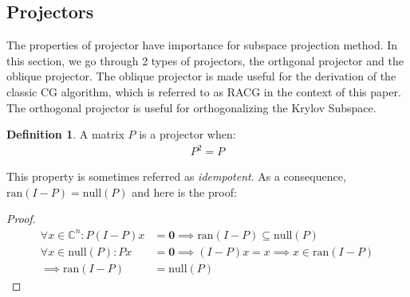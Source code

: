 \documentclass[]{article}
\theoremstyle{definition}
\newtheorem{definition}{Definition}
\begin{document}
    \subsection{Projectors}
        The properties of projector have importance for subspace projection method. In this section, we go through 2 types of projectors, the orthgonal projector and the oblique projector. The oblique projector is made useful for the derivation of the classic CG algorithm, which is referred to as RACG in the context of this paper. The orthogonal projector is useful for orthogonalizing the Krylov Subspace. 
        \begin{definition}
            A matrix $P$ is a projector when: 
            \begin{align}
                P^2 = P
            \end{align}    
        \end{definition}
        This property is sometimes referred as \textit{idempotent}. As a consequence, $\text{ran}(I - P) = \text{null}(P)$ and here is the proof: 
        \begin{proof}
            \begin{align}
                \forall x \in \mathbb{C}^n: P(I - P)x &= \mathbf{0} \implies \text{ran}(I - P)\subseteq \text{null}(P)
                \\
                \forall x \in \text{null}(P): Px &= \mathbf{0} \implies (I - P)x = x \implies x \in \text{ran}(I - P)
                \\
                \implies \text{ran}(I - P) &= \text{null}(P)
                \label{a:1.1.4}
            \end{align}
        \end{proof}
        \noindent
\end{document}
